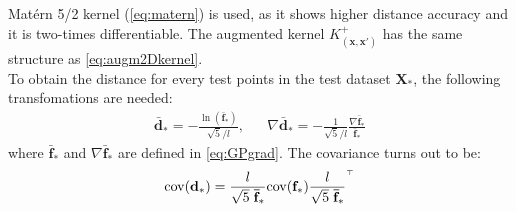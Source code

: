 \documentclass[10pt,a4paper,twocolumn]{article}
\newcommand{\trsp}{{\scriptscriptstyle\top}}
\newcommand{\cov}{\mathrm{cov}}
\begin{document}
Matérn 5/2 kernel (\autoref{eq:matern}) is used, as it shows higher distance accuracy and it is two-times differentiable. The augmented kernel $K^+_{(\mathbf{x}, \mathbf{x'})}$ has the same structure as \autoref{eq:augm2Dkernel}.\\
To obtain the distance for every test points in the test dataset $\mathbf{X_*}$, the following transfomations are needed:
\begin{equation}
	\begin{aligned}
		\mathbf{\bar{d}_*} = -\frac{\ln(\mathbf{\bar{f}_*})}{\sqrt{5}/l}, &&
		\nabla \mathbf{\bar{d}_*} = - \frac{1}{\sqrt{5}/l} \frac{\nabla \mathbf{\bar{f}_*}}{\mathbf{\bar{f}_*}}
	\end{aligned}
\end{equation}
where $\mathbf{\bar{f}_*}$ and $\nabla \mathbf{\bar{f}_*}$ are defined in \autoref{eq:GPgrad}.
The covariance turns out to be:
\begin{equation}
	\cov(\mathbf{d}_*) = \frac{l}{\sqrt{5} \hspace{1mm} \mathbf{\bar{f}_*}} \cov(\mathbf{f}_*) \frac{l}{\sqrt{5} \hspace{1mm} \mathbf{\bar{f}_*}}^\trsp
\end{equation}

\end{document}
